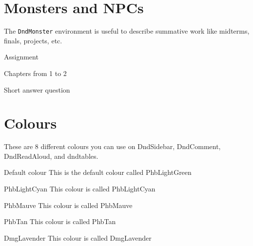 \documentclass[letterpaper,10pt,twoside,twocolumn,openany]{book}
\begin{document}
\chapter{Monsters and NPCs}
The \texttt{DndMonster} environment is useful to describe summative work like midterms, finals, projects, etc. 
\begin{DndMonster}[]{Assignment}

  \DndMonsterBasics[armor-class = {10 \%}, hit-points = {50 marks}, speed = {1 week}]

  \DndMonsterAbilityScores[str = 12, dex = 8, con = 13, int = 20, wis = 20, cha = 15]

  \DndMonsterDetails[
  damage-vulnerabilities = {Wolfram Alpha},
  damage-immunities = {Mathimatica},
  senses = {},
  languages = {Algebra, Integration, Derivatives},
  challenge = 1,
  ]

  Chapters from 1 to 2

  Short answer question
  \label{monster:Assignment}
\end{DndMonster}  


\chapter{Colours}
These are 8 different colours you can use on DndSidebar, DndComment, DndReadAloud, and dndtables.
\begin{DndSidebar}[color=PhbLightGreen]{Default colour}
  This is the default colour called PhbLightGreen
\end{DndSidebar}

\begin{DndSidebar}[color=PhbLightCyan]{PhbLightCyan}
  This colour is called PhbLightCyan
\end{DndSidebar}

\begin{DndSidebar}[color=PhbMauve]{PhbMauve}
  This colour is called PhbMauve
\end{DndSidebar}

\begin{DndSidebar}[color=PhbTan]{PhbTan}
  This colour is called PhbTan
\end{DndSidebar}

\begin{DndSidebar}[color=DmgLavender]{DmgLavender}
  This colour is called DmgLavender
\end{DndSidebar}
\end{document}
